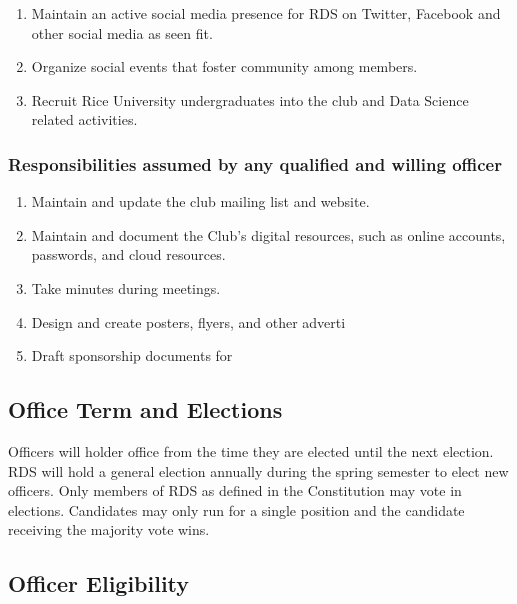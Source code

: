\documentclass[12pt]{article}
\begin{document}
\begin{enumerate}
  \item Maintain an active social media presence for RDS on Twitter, Facebook
    and other social media as seen fit. 

  \item Organize social events that foster community among members. 

  \item Recruit Rice University undergraduates into the club and Data Science
    related activities.
\end{enumerate}


\subsubsection{Responsibilities assumed by any qualified and willing officer}%

\begin{enumerate}
  \item Maintain and update the club mailing list and website.
    
  \item Maintain and document the Club's digital resources, such as online accounts,
    passwords, and cloud resources.

  \item Take minutes during meetings.

  \item Design and create posters, flyers, and other adverti
  \item Draft sponsorship documents for 
\end{enumerate}
    
\subsection{Office Term and Elections}

Officers will holder office from the time they are elected until the next
election. RDS will hold a general election annually during the spring semester
to elect new officers. Only members of RDS as defined in the Constitution may
vote in elections. Candidates may only run for a single position and the
candidate receiving the majority vote wins.

\subsection{Officer Eligibility}
\end{document}
